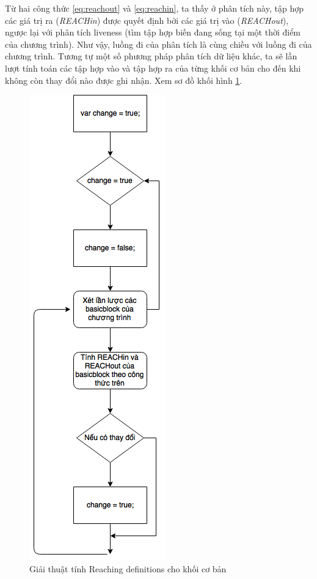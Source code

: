 Từ hai công thức \ref{eq:reachout} và \ref{eq:reachin}, ta thấy ở phân tích này, tập hợp các giá trị ra (\textit{REACHin}) được quyết định bởi các giá trị vào (\textit{REACHout}), ngược lại với phân tích liveness (tìm tập hợp biến đang sống tại một thời điểm của chương trình). Như vậy, luồng đi của phân tích là cùng chiều với luồng đi của chương trình. Tương tự một số phương pháp phân tích dữ liệu khác, ta sẽ lần lượt tính toán các tập hợp vào và tập hợp ra của từng khối cơ bản cho đến khi không còn thay đổi nào được ghi nhận. Xem sơ đồ khối hình \ref{fig:reachingdefalgo}.

\begin{figure}
	\centering
	\includegraphics[scale=0.75]{image/reachingDefAlgo}
	\caption{Giải thuật tính Reaching definitions cho khối cơ bản}
	\label{fig:reachingdefalgo}
\end{figure}

